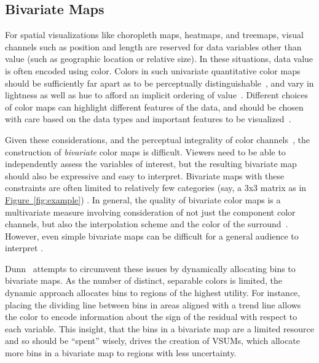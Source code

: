 \documentclass{vgtc}                          %
\newcommand{\figref}[1]{\hyperref[#1]{Figure~\ref*{#1}}}
\begin{document}
\subsection{Bivariate Maps}

For spatial visualizations like choropleth maps, heatmaps, and treemaps, visual channels such as position and length are reserved for data variables other than value (such as geographic location or relative size). In these situations, data value is often encoded using color. Colors in such univariate quantitative color maps should be sufficiently far apart as to be perceptually distinguishable~\cite{ware1988color}, and vary in lightness as well as hue to afford an implicit ordering of value~\cite{borland2007rainbow,rogowitz2001blair}. Different choices of color maps can highlight different features of the data, and should be chosen with care based on the data types and important features to be visualized~\cite{rogowitz1996not}.

Given these considerations, and the perceptual integrality of color channels~\cite{garner1970integrality, ware2012information}, the construction of \emph{bivariate} color maps is difficult. Viewers need to be able to independently assess the variables of interest, but the resulting bivariate map should also be expressive and easy to interpret. Bivariate maps with these constraints are often limited to relatively few categories (say, a 3x3 matrix as in \figref{fig:example}) \cite{robertson1986generation,trumbo1981theory}. In general, the quality of bivariate color maps is a multivariate measure involving consideration of not just the component color channels, but also the interpolation scheme and the color of the surround~\cite{bernard2015survey}. However, even simple bivariate maps can be difficult for a general audience to interpret \cite{wainer1980empirical}.

Dunn~\cite{dunn1989dynamic} attempts to circumvent these issues by dynamically allocating bins to bivariate maps. As the number of distinct, separable colors is limited, the dynamic approach allocates bins to regions of the highest utility. For instance, placing the dividing line between bins in areas aligned with a trend line allows the color to encode information about the sign of the residual with respect to each variable. This insight, that the bins in a bivariate map are a limited resource and so should be ``spent'' wisely, drives the creation of VSUMs, which allocate more bins in a bivariate map to regions with less uncertainty.
\end{document}
